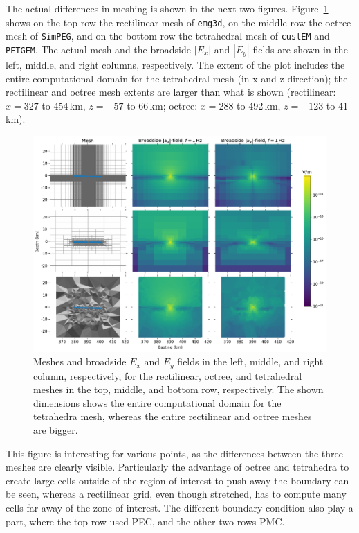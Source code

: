 \documentclass[onecolumn,extra,camera]{gji}
\newcommand{\emg}[2]{\texttt{emg#1#2}\xspace}
\newcommand{\simpeg}{\texttt{SimPEG}\xspace}
\newcommand{\custem}{\texttt{custEM}\xspace}
\newcommand{\petgem}{\texttt{PETGEM}\xspace}
\begin{document}
The actual differences in meshing is shown in the next two figures. Figure~\ref{fig:results-marlim_big} shows on the top row the rectilinear mesh of \emg3d, on the middle row the octree mesh of \simpeg, and on the bottom row the tetrahedral mesh of \custem and \petgem. The actual mesh and the broadside $|E_x|$ and $|E_y|$ fields are shown in the left, middle, and right columns, respectively. The extent of the plot includes the entire computational domain for the tetrahedral mesh (in x and z direction); the rectilinear and octree mesh extents are larger than what is shown (rectilinear: $x=327$ to 454\,km, $z=-57$ to 66\,km; octree: $x=288$ to 492\,km, $z=-123$ to 41\,km).
%
\begin{figure}
  \centering
  \includegraphics[width=.9\linewidth]{figures/results-marlim_big}
  \caption{Meshes and broadside $E_x$ and $E_y$ fields in the left, middle, and right column, respectively, for the rectilinear, octree, and tetrahedral meshes in the top, middle, and bottom row, respectively. The shown dimensions shows the entire computational domain for the tetrahedra mesh, whereas the entire rectilinear and octree meshes are bigger.}
  \label{fig:results-marlim_big}
\end{figure}
%
This figure is interesting for various points, as the differences between the three meshes are clearly visible. Particularly the advantage of octree and tetrahedra to create large cells outside of the region of interest to push away the boundary can be seen, whereas a rectilinear grid, even though stretched, has to compute many cells far away of the zone of interest. The different boundary condition also play a part, where the top row used PEC, and the other two rows PMC.
\end{document}
